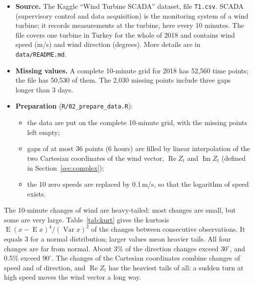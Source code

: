 \documentclass[11pt,a4paper]{article}
\newcommand{\code}[1]{\texttt{#1}}
\DeclareMathOperator{\E}{E}
\newcommand{\1}{\mathbf{1}}
\renewcommand{\Re}{\operatorname{Re}}
\renewcommand{\Im}{\operatorname{Im}}
\begin{document}
\begin{itemize}
  \item \textbf{Source.} The Kaggle ``Wind Turbine SCADA'' dataset, file \code{T1.csv}. SCADA
    (supervisory control and data acquisition) is the monitoring system of a wind turbine; it
    records measurements at the turbine, here every 10 minutes. The file covers one turbine in
    Turkey for the whole of 2018 and contains wind speed (m/s) and wind direction (degrees).
    More details are in \code{data/README.md}.
  \item \textbf{Missing values.} A complete 10-minute grid for 2018 has 52,560 time points; the
    file has 50,530 of them. The 2,030 missing points include three gaps longer than 3 days.
  \item \textbf{Preparation} (\code{R/02\_prepare\_data.R}):
  \begin{itemize}
    \item the data are put on the complete 10-minute grid, with the missing points left empty;
    \item gaps of at most 36 points (6 hours) are filled by linear interpolation of the two
      Cartesian coordinates of the wind vector, $\Re Z_t$ and $\Im Z_t$ (defined in
      Section~\ref{sec:complex});
    \item the 10 zero speeds are replaced by 0.1\,m/s, so that the logarithm of speed exists.
  \end{itemize}
\end{itemize}

The 10-minute changes of wind are heavy-tailed: most changes are small, but some are very large.
Table~\ref{tab:kurt} gives the kurtosis $\E(x - \E x)^4/(\operatorname{Var} x)^2$ of the changes
between consecutive observations. It equals 3 for a normal distribution; larger values mean
heavier tails. All four changes are far from normal. About 3\% of the direction changes exceed
$30^\circ$, and 0.5\% exceed $90^\circ$. The changes of the Cartesian coordinates combine changes of speed and of direction, and
$\Re Z_t$ has the heaviest tails of all: a sudden turn at high speed moves the wind vector a long way.
\end{document}
